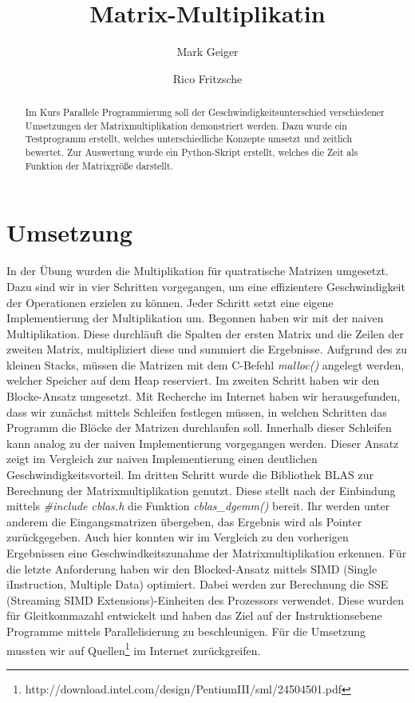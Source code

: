 \documentclass[]{article}
\title{Matrix-Multiplikatin}
\author{Mark Geiger \and Rico Fritzsche}
\begin{document}
\maketitle

\begin{abstract}
Im Kurs Parallele Programmierung soll der Geschwindigkeitsunterschied verschiedener Umsetzungen der Matrixmultiplikation demonstriert werden. Dazu wurde ein Testprogramm erstellt, welches unterschiedliche Konzepte umsetzt und zeitlich bewertet. Zur Auswertung wurde ein Python-Skript erstellt, welches die Zeit als Funktion der Matrixgröße darstellt.
\end{abstract}

\section*{Umsetzung}
In der Übung wurden die Multiplikation für quatratische Matrizen umgesetzt. Dazu sind wir in vier Schritten vorgegangen, um eine effizientere Geschwindigkeit der Operationen erzielen zu können. Jeder Schritt setzt eine eigene Implementierung der Multiplikation um. Begonnen haben wir mit der naiven Multiplikation. Diese durchläuft die Spalten der ersten Matrix und die Zeilen der zweiten Matrix, multipliziert diese und summiert die Ergebnisse. Aufgrund des zu kleinen Stacks, müssen die Matrizen mit dem C-Befehl \textit{malloc()} angelegt werden, welcher Speicher auf dem Heap reserviert. Im zweiten Schritt haben wir den Blocke-Ansatz umgesetzt. Mit Recherche im Internet haben wir herausgefunden, dass wir zunächst mittels Schleifen festlegen müssen, in welchen Schritten das Programm die Blöcke der Matrizen durchlaufen soll. Innerhalb dieser Schleifen kann analog zu der naiven Implementierung vorgegangen werden. Dieser Ansatz zeigt im Vergleich zur naiven Implementierung einen deutlichen Geschwindigkeitsvorteil. Im dritten Schritt wurde die Bibliothek BLAS zur Berechnung der Matrixmultiplikation genutzt. Diese stellt nach der Einbindung mittels \textit{\#include cblas.h} die Funktion \textit{cblas\_dgemm()} bereit. Ihr werden unter anderem die Eingangsmatrizen übergeben, das Ergebnis wird als Pointer zurückgegeben. Auch hier konnten wir im Vergleich zu den vorherigen Ergebnissen eine Geschwindkeitszunahme der Matrixmultiplikation erkennen. Für die letzte Anforderung haben wir den Blocked-Ansatz mittels SIMD (Single iInstruction, Multiple Data) optimiert. Dabei werden zur Berechnung die SSE (Streaming SIMD Extensions)-Einheiten des Prozessors verwendet. Diese wurden für Gleitkommazahl entwickelt und haben das Ziel auf der Instruktionsebene Programme mittels Parallelisierung zu beschleunigen. Für die Umsetzung mussten wir auf Quellen\footnote{http://download.intel.com/design/PentiumIII/sml/24504501.pdf} im Internet zurückgreifen. 
\end{document}
